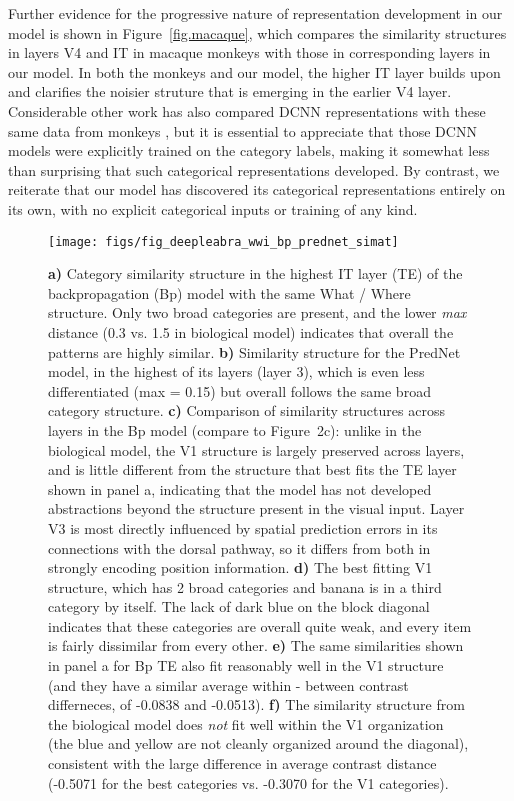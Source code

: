 \documentclass[11pt,twoside]{article}
\newif\myifpdf
\begin{document}
Further evidence for the progressive nature of representation development in our model is shown in Figure~\ref{fig.macaque}, which compares the similarity structures in layers V4 and IT in macaque monkeys \cite{CadieuHongYaminsEtAl14} with those in corresponding layers in our model.  In both the monkeys and our model, the higher IT layer builds upon and clarifies the noisier struture that is emerging in the earlier V4 layer.  Considerable other work has also compared DCNN representations with these same data from monkeys \cite{CadieuHongYaminsEtAl14}, but it is essential to appreciate that those DCNN models were explicitly trained on the category labels, making it somewhat less than surprising that such categorical representations developed.  By contrast, we reiterate that our model has discovered its categorical representations entirely on its own, with no explicit categorical inputs or training of any kind.


\begin{figure}
  \centering\texttt{[image: figs/fig\_deepleabra\_wwi\_bp\_prednet\_simat]}
  \caption{\small {\bf a)} Category similarity structure in the highest IT layer (TE) of the backpropagation (Bp) model with the same What / Where structure.  Only two broad categories are present, and the lower {\em max} distance (0.3 vs. 1.5 in biological model) indicates that overall the patterns are highly similar.  {\bf b)} Similarity structure for the PredNet model, in the highest of its layers (layer 3), which is even less differentiated (max = 0.15) but overall follows the same broad category structure.  {\bf c)} Comparison of similarity structures across layers in the Bp model (compare to Figure~2c): unlike in the biological model, the V1 structure is largely preserved across layers, and is little different from the structure that best fits the TE layer shown in panel a, indicating that the model has not developed abstractions beyond the structure present in the visual input.  Layer V3 is most directly influenced by spatial prediction errors in its connections with the dorsal pathway, so it differs from both in strongly encoding position information.  {\bf d)} The best fitting V1 structure, which has 2 broad categories and banana is in a third category by itself.  The lack of dark blue on the block diagonal indicates that these categories are overall quite weak, and every item is fairly dissimilar from every other.  {\bf e)} The same similarities shown in panel a for Bp TE also fit reasonably well in the V1 structure (and they have a similar average within - between contrast differneces, of -0.0838 and -0.0513).  {\bf f)} The similarity structure from the biological model does {\em not} fit well within the V1 organization (the blue and yellow are not cleanly organized around the diagonal), consistent with the large difference in average contrast distance (-0.5071 for the best categories vs. -0.3070 for the V1 categories).}
  \label{fig.bpred}
\end{figure}
\end{document}
